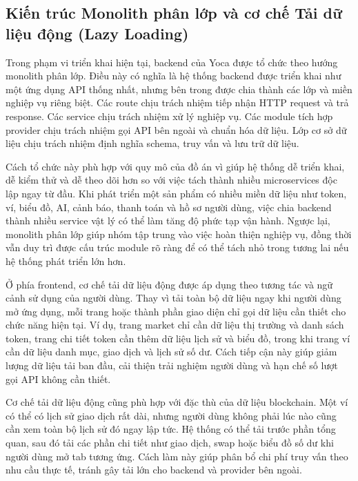 

\subsection{Kiến trúc Monolith phân lớp và cơ chế Tải dữ liệu động (Lazy Loading)}

Trong phạm vi triển khai hiện tại, backend của Yoca được tổ chức theo hướng monolith phân lớp. Điều này có nghĩa là hệ thống backend được triển khai như một ứng dụng API thống nhất, nhưng bên trong được chia thành các lớp và miền nghiệp vụ riêng biệt. Các route chịu trách nhiệm tiếp nhận HTTP request và trả response. Các service chịu trách nhiệm xử lý nghiệp vụ. Các module tích hợp provider chịu trách nhiệm gọi API bên ngoài và chuẩn hóa dữ liệu. Lớp cơ sở dữ liệu chịu trách nhiệm định nghĩa schema, truy vấn và lưu trữ dữ liệu.

Cách tổ chức này phù hợp với quy mô của đồ án vì giúp hệ thống dễ triển khai, dễ kiểm thử và dễ theo dõi hơn so với việc tách thành nhiều microservices độc lập ngay từ đầu. Khi phát triển một sản phẩm có nhiều miền dữ liệu như token, ví, biểu đồ, AI, cảnh báo, thanh toán và hồ sơ người dùng, việc chia backend thành nhiều service vật lý có thể làm tăng độ phức tạp vận hành. Ngược lại, monolith phân lớp giúp nhóm tập trung vào việc hoàn thiện nghiệp vụ, đồng thời vẫn duy trì được cấu trúc module rõ ràng để có thể tách nhỏ trong tương lai nếu hệ thống phát triển lớn hơn.

Ở phía frontend, cơ chế tải dữ liệu động được áp dụng theo tương tác và ngữ cảnh sử dụng của người dùng. Thay vì tải toàn bộ dữ liệu ngay khi người dùng mở ứng dụng, mỗi trang hoặc thành phần giao diện chỉ gọi dữ liệu cần thiết cho chức năng hiện tại. Ví dụ, trang market chỉ cần dữ liệu thị trường và danh sách token, trang chi tiết token cần thêm dữ liệu lịch sử và biểu đồ, trong khi trang ví cần dữ liệu danh mục, giao dịch và lịch sử số dư. Cách tiếp cận này giúp giảm lượng dữ liệu tải ban đầu, cải thiện trải nghiệm người dùng và hạn chế số lượt gọi API không cần thiết.

Cơ chế tải dữ liệu động cũng phù hợp với đặc thù của dữ liệu blockchain. Một ví có thể có lịch sử giao dịch rất dài, nhưng người dùng không phải lúc nào cũng cần xem toàn bộ lịch sử đó ngay lập tức. Hệ thống có thể tải trước phần tổng quan, sau đó tải các phần chi tiết như giao dịch, swap hoặc biểu đồ số dư khi người dùng mở tab tương ứng. Cách làm này giúp phân bổ chi phí truy vấn theo nhu cầu thực tế, tránh gây tải lớn cho backend và provider bên ngoài.

